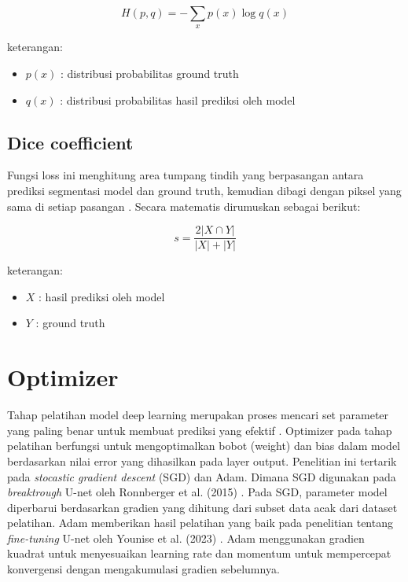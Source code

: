 \begin{equation} 
	H(p, q) = - \sum_{x} p(x) \log q(x) 
\end{equation} 

\noindent
keterangan:
\begin{itemize}
	\item $p(x)$ : distribusi probabilitas ground truth
	\item $q(x)$ : distribusi probabilitas hasil prediksi oleh model
\end{itemize}

\subsection{Dice coefficient} Fungsi loss ini menghitung area tumpang tindih yang berpasangan antara prediksi segmentasi model dan ground truth, kemudian dibagi dengan piksel yang sama di setiap pasangan \cite{herrera_impact_2022}. Secara matematis dirumuskan sebagai berikut:

\begin{equation}
	s = \frac{2|X \cap Y|}{|X| + |Y|}
\end{equation}
	
\noindent
keterangan:
\begin{itemize}
	\item $X$ : hasil prediksi oleh model
	\item $Y$ : ground truth
\end{itemize}


\section{Optimizer}
\noindent Tahap pelatihan model deep learning merupakan proses mencari set parameter yang paling benar untuk membuat prediksi yang efektif \cite{dawani_hands-mathematics_2020, bishop_deep_2024}. Optimizer pada tahap pelatihan berfungsi untuk mengoptimalkan bobot (weight) dan bias dalam model berdasarkan nilai error yang dihasilkan pada layer output.  Penelitian ini tertarik pada \textit{stocastic gradient descent} (SGD) dan Adam. Dimana SGD digunakan pada \textit{breaktrough} U-net oleh Ronnberger et al. (2015) \cite{ronneberger_u-net_2015}. Pada SGD, parameter model diperbarui berdasarkan gradien yang dihitung dari subset data acak dari dataset pelatihan. Adam memberikan hasil pelatihan yang baik pada penelitian tentang \textit{fine-tuning} U-net oleh Younise et al. (2023) \cite{younisse_fine-tuning_2023}. Adam menggunakan gradien kuadrat untuk menyesuaikan learning rate dan momentum untuk mempercepat konvergensi dengan mengakumulasi gradien sebelumnya.

